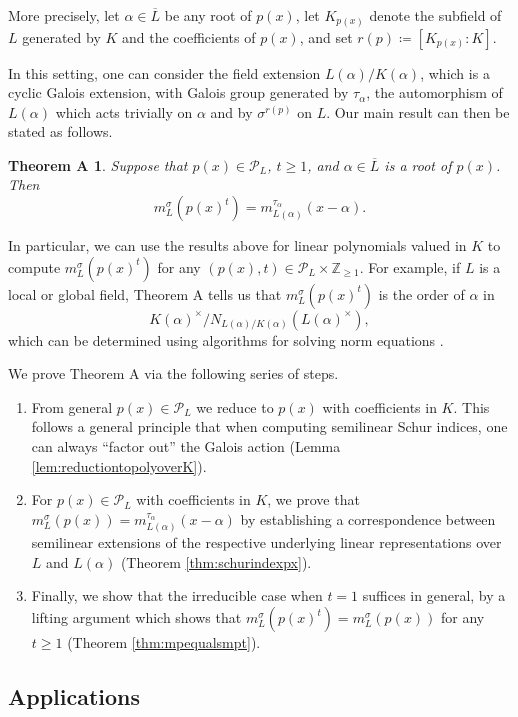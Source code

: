 \documentclass[10pt, reqno, hidelinks]{amsart}
\newcommand{\bZ}{{\mathbb Z}}
\newcommand{\sP}{{\mathcal P}}
\numberwithin{thm}{subsection}
\newtheorem*{theoremA}{Theorem A}
\theoremstyle{definition}
\begin{document}
More precisely, let $\alpha \in \overline{L}$ be any root of $p(x)$, let $K_{p(x)}$ denote the subfield of $L$ generated by $K$ and the coefficients of $p(x)$, and set $r(p) \coloneqq [K_{p(x)} : K]$.

In this setting, one can consider the field extension $L(\alpha) / K(\alpha)$, which is a cyclic Galois extension, with Galois group generated by $\tau_{\alpha}$, the automorphism of $L(\alpha)$ which acts trivially on $\alpha$ and by $\sigma^{r(p)}$ on $L$. Our main result can then be stated as follows.

\begin{theoremA}
	Suppose that $p(x) \in \sP_L$, $t \geq 1$, and $\alpha \in \overline{L}$ is a root of $p(x)$. Then
	\[
		m_L^{\sigma}(p(x)^t) = m_{L(\alpha)}^{\tau_{\alpha}}(x - \alpha).
	\]	
\end{theoremA}

In particular, we can use the results above for linear polynomials valued in $K$ to compute $m_L^{\sigma}(p(x)^t)$ for any $(p(x),t) \in \sP_L \times \bZ_{\geq 1}$. For example, if $L$ is a local or global field, Theorem A tells us that $m_L^{\sigma}(p(x)^t)$ is the order of $\alpha$ in 
\[
K(\alpha)^{\times} / N_{L(\alpha) / K(\alpha)}(L(\alpha)^{\times}),
\]
which can be determined using algorithms for solving norm equations \cite{AccKlu, Coh, LJMS, Denis}.

We prove Theorem A via the following series of steps.

\begin{enumerate}
	\item From general $p(x) \in \sP_L$ we reduce to $p(x)$ with coefficients in $K$. This follows a general principle that when computing semilinear Schur indices, one can always ``factor out'' the Galois action (Lemma \ref{lem:reductiontopolyoverK}).
	\item For $p(x) \in \sP_L$ with coefficients in $K$, we prove that $m_L^{\sigma}(p(x)) = m_{L(\alpha)}^{\tau_{\alpha}}(x - \alpha)$ by establishing a correspondence between semilinear extensions of the respective underlying linear representations over $L$ and $L(\alpha)$ (Theorem \ref{thm:schurindexpx}).
	\item Finally, we show that the irreducible case when $t = 1$ suffices in general, by a lifting argument which shows that $m_L^{\sigma}(p(x)^t) = m_L^{\sigma}(p(x))$ for any $t \geq 1$ (Theorem \ref{thm:mpequalsmpt}).
\end{enumerate}

\subsection*{Applications}
\end{document}
